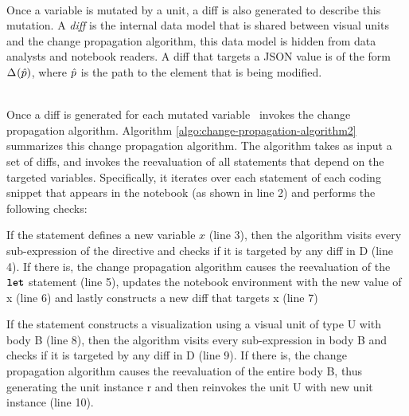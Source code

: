  \\ Once a variable is mutated by a unit, a diff is also generated to describe this mutation. A \emph{diff} is the internal data model that is shared between visual units and the change propagation algorithm, this data model is hidden from data analysts and notebook readers. A diff that targets a JSON value is of the form $\Delta^{}_{}(\hat{p})$, where $\hat{p}$ is the path to the element that is being modified. 


\\
Once a diff is generated for each mutated variable \projname\ invokes the change propagation algorithm. Algorithm \ref{algo:change-propagation-algorithm2} summarizes this change propagation algorithm. The algorithm takes as input a set of diffs, and invokes the reevaluation of all statements that depend on the targeted variables. Specifically, it iterates over each statement of each coding snippet that appears in the notebook (as shown in line 2) and performs the following checks:

\begin{compactitem}

\item If the statement defines a new variable $x$ (line 3), then the algorithm visits every sub-expression of the  directive and checks if it is targeted by any diff in D (line 4). If there is, the change propagation algorithm causes the reevaluation of the $\texttt{\textbf{let}}$ statement (line 5), updates the notebook environment with the new value of x (line 6) and lastly constructs a new diff that targets x (line 7)

\item If the statement constructs a visualization using a visual unit of type U with body B (line 8), then the algorithm visits every sub-expression in body B and checks if it is targeted by any diff in D (line 9). If there is, the change propagation algorithm causes the reevaluation of the entire body B, thus generating the unit instance r and then reinvokes the unit U with new unit instance (line 10).



\end{compactitem}


